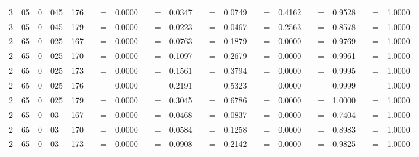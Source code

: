 \begin{tabular*}{260mm}{r@{.}lr@{.}lc|ccc:ccc:ccc:ccc:ccc|ccc}
		3&05	&	0&045	&	176	&	\nicefrac{}{} &=& 0.0000 & 	 &=& 0.0347 & 	 &=& 0.0749 & 	 &=& 0.4162 & 	 &=& 0.9528 & 	 &=& 1.0000 \\ 
		3&05	&	0&045	&	179	&	\nicefrac{}{} &=& 0.0000 & 	 &=& 0.0223 & 	 &=& 0.0467 & 	 &=& 0.2563 & 	 &=& 0.8578 & 	 &=& 1.0000 \\ 
		2&65	&	0&025	&	167	&	\nicefrac{}{} &=& 0.0000 & 	 &=& 0.0763 & 	 &=& 0.1879 & 	\nicefrac{}{} &=& 0.0000 & 	 &=& 0.9769 & 	 &=& 1.0000 \\ 
		2&65	&	0&025	&	170	&	\nicefrac{}{} &=& 0.0000 & 	 &=& 0.1097 & 	 &=& 0.2679 & 	\nicefrac{}{} &=& 0.0000 & 	 &=& 0.9961 & 	 &=& 1.0000 \\ 
		2&65	&	0&025	&	173	&	\nicefrac{}{} &=& 0.0000 & 	 &=& 0.1561 & 	 &=& 0.3794 & 	\nicefrac{}{} &=& 0.0000 & 	 &=& 0.9995 & 	 &=& 1.0000 \\ 
		2&65	&	0&025	&	176	&	\nicefrac{}{} &=& 0.0000 & 	 &=& 0.2191 & 	 &=& 0.5323 & 	\nicefrac{}{} &=& 0.0000 & 	 &=& 0.9999 & 	 &=& 1.0000 \\ 
		2&65	&	0&025	&	179	&	\nicefrac{}{} &=& 0.0000 & 	 &=& 0.3045 & 	 &=& 0.6786 & 	\nicefrac{}{} &=& 0.0000 & 	 &=& 1.0000 & 	 &=& 1.0000 \\ 
		2&65	&	0&03	&	167	&	\nicefrac{}{} &=& 0.0000 & 	 &=& 0.0468 & 	 &=& 0.0837 & 	\nicefrac{}{} &=& 0.0000 & 	 &=& 0.7404 & 	 &=& 1.0000 \\ 
		2&65	&	0&03	&	170	&	\nicefrac{}{} &=& 0.0000 & 	 &=& 0.0584 & 	 &=& 0.1258 & 	\nicefrac{}{} &=& 0.0000 & 	 &=& 0.8983 & 	 &=& 1.0000 \\ 
		2&65	&	0&03	&	173	&	\nicefrac{}{} &=& 0.0000 & 	 &=& 0.0908 & 	 &=& 0.2142 & 	\nicefrac{}{} &=& 0.0000 & 	 &=& 0.9825 & 	 &=& 1.0000 \\ 

\end{tabular*}
